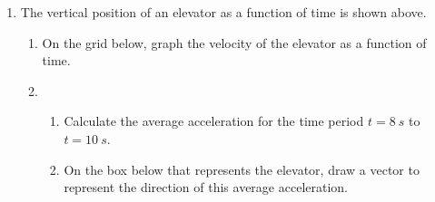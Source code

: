 \documentclass{../../../oss-apphys}
\begin{document}
\begin{enumerate}[leftmargin=15pt]

  
\item The vertical position of an elevator as a function of time is shown above.
  \begin{enumerate}[nosep]
  \item On the grid below, graph the velocity of the elevator as a function of
    time.
    \newpage
    
  \item 
    \begin{enumerate}[nosep]
    \item Calculate the average acceleration for the time period $t=\SI{8}{s}$
      to $t=\SI{10}{s}$.
    \item On the box below that represents the elevator, draw a vector to
      represent the direction of this average acceleration.
      \begin{center}
        \vspace{1in}
      \end{center}
    \end{enumerate}
    \vspace{1in}
    

\end{enumerate}
\end{enumerate}
\end{document}
